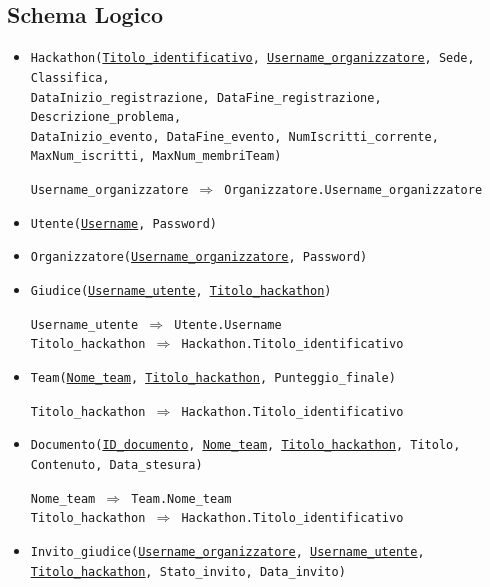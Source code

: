 \documentclass[a4paper, 11pt]{article}
\begin{document}
	\subsection{Schema Logico}
	\begin{itemize}
		\item \texttt{Hackathon(\underline{Titolo\_identificativo}, \underline{\underline{Username\_organizzatore}}, Sede, Classifica,\\
			DataInizio\_registrazione, DataFine\_registrazione, Descrizione\_problema, 
			\\DataInizio\_evento, DataFine\_evento, NumIscritti\_corrente, MaxNum\_iscritti, MaxNum\_membriTeam)}
		\begin{graybox}
			\texttt{Username\_organizzatore $\Rightarrow$ Organizzatore.Username\_organizzatore}
		\end{graybox}
		\item \texttt{Utente(\underline{Username}, Password)}
		\item \texttt{Organizzatore(\underline{Username\_organizzatore}, Password)}
		\item \texttt{Giudice(\underline{\underline{Username\_utente}}, \underline{\underline{Titolo\_hackathon}})}
		\begin{graybox}
			\texttt{Username\_utente $\Rightarrow$ Utente.Username}\\
			\texttt{Titolo\_hackathon $\Rightarrow$ Hackathon.Titolo\_identificativo}
		\end{graybox}
		\item \texttt{Team(\underline{Nome\_team}, \underline{\underline{Titolo\_hackathon}}, Punteggio\_finale)}
		\begin{graybox}
			\texttt{Titolo\_hackathon $\Rightarrow$ Hackathon.Titolo\_identificativo}
		\end{graybox}
		\item \texttt{Documento(\underline{ID\_documento}, \underline{\underline{Nome\_team}}, \underline{\underline{Titolo\_hackathon}}, Titolo,\\Contenuto, Data\_stesura)}
		\begin{graybox}
			\texttt{Nome\_team $\Rightarrow$ Team.Nome\_team}\\
			\texttt{Titolo\_hackathon $\Rightarrow$ Hackathon.Titolo\_identificativo}
		\end{graybox}
		\item \texttt{Invito\_giudice(\underline{\underline{Username\_organizzatore}}, \underline{\underline{Username\_utente}}, \underline{\underline{Titolo\_hackathon}}, Stato\_invito, Data\_invito)}

\end{itemize}
\end{document}

